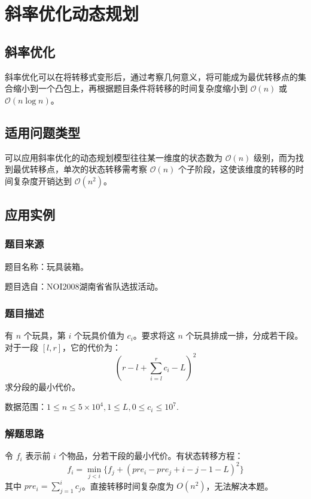 
\chapter{斜率优化动态规划}

\section{斜率优化}

斜率优化可以在将转移式变形后，通过考察几何意义，将可能成为最优转移点的集合缩小到一个凸包上，再根据题目条件将转移的时间复杂度缩小到
\(\mathcal{O}(n)\) 或 \(\mathcal{O}(n\log n)\)。

\section{适用问题类型}

可以应用斜率优化的动态规划模型往往某一维度的状态数为 \(\mathcal{O}(n)\)
级别，而为找到最优转移点，单次的状态转移需考察 \(\mathcal{O}(n)\)
个子阶段，这使该维度的转移的时间复杂度开销达到 \(\mathcal{O}(n^2)\)。

\section{应用实例}

\subsection{题目来源}

题目名称：玩具装箱。

题目选自：NOI2008湖南省省队选拔活动。

\subsection{题目描述}

有 \(n\) 个玩具，第 \(i\) 个玩具价值为 \(c_i\)。要求将这 \(n\)
个玩具排成一排，分成若干段。对于一段 \([l,r]\)，它的代价为： \[
(r-l+\sum_{i=l}^r c_i-L)^2
\] 求分段的最小代价。

数据范围：\(1\le n\le 5\times 10^4,1\le L,0\le c_i\le 10^7\).

\subsection{解题思路}

令 \(f_i\) 表示前 \(i\) 个物品，分若干段的最小代价。有状态转移方程： \[
f_i=\min_{j<i}{\{f_j+(pre_i-pre_j+i-j-1-L)^2\}}
\] 其中 \(pre_i = \sum_{j=1}^i c_j\)。直接转移时间复杂度为
\(O (n^2)\)，无法解决本题。

